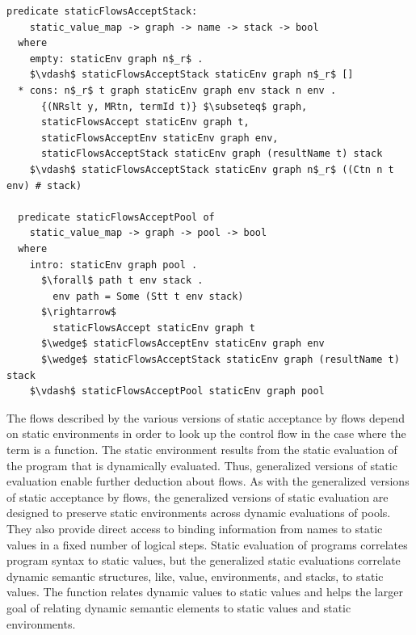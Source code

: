 \documentclass[letterpaper, 11pt]{extarticle}
\begin{document}
\begin{lstlisting}[language=logic, mathescape]
  predicate staticFlowsAcceptStack:
    static_value_map -> graph -> name -> stack -> bool
  where
    empty: staticEnv graph n$_r$ .
    $\vdash$ staticFlowsAcceptStack staticEnv graph n$_r$ []
  * cons: n$_r$ t graph staticEnv graph env stack n env .
      {(NRslt y, MRtn, termId t)} $\subseteq$ graph,
      staticFlowsAccept staticEnv graph t,
      staticFlowsAcceptEnv staticEnv graph env,
      staticFlowsAcceptStack staticEnv graph (resultName t) stack 
    $\vdash$ staticFlowsAcceptStack staticEnv graph n$_r$ ((Ctn n t env) # stack)

  predicate staticFlowsAcceptPool of
    static_value_map -> graph -> pool -> bool
  where
    intro: staticEnv graph pool .
      $\forall$ path t env stack .
        env path = Some (Stt t env stack)
      $\rightarrow$
        staticFlowsAccept staticEnv graph t
      $\wedge$ staticFlowsAcceptEnv staticEnv graph env
      $\wedge$ staticFlowsAcceptStack staticEnv graph (resultName t) stack
    $\vdash$ staticFlowsAcceptPool staticEnv graph pool
\end{lstlisting}

The flows described by the various versions of static acceptance by flows depend on static
environments in order to look up the control flow in the case where the term is a function.
The static environment
results from the static evaluation of the program that is dynamically evaluated. Thus,
generalized
versions of static evaluation enable further deduction about flows.
As with the generalized versions of static acceptance by flows,
the generalized versions of static evaluation are designed to
preserve static environments across
dynamic evaluations of pools. They also provide direct access to binding information from names
to static values in a fixed number of logical steps. Static evaluation of programs correlates
program syntax to static values, but the generalized static evaluations correlate dynamic
semantic structures, like, value, environments, and stacks, to static values. The function
relates dynamic values to static values and helps the larger goal of relating dynamic
semantic elements to static values and static environments.   
\end{document}

